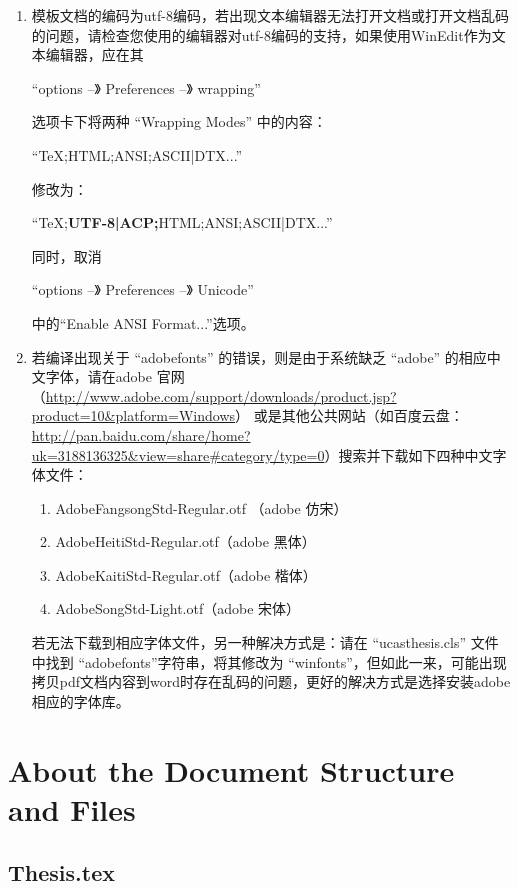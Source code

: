 \begin{enumerate}
  \item 模板文档的编码为utf-8编码，若出现文本编辑器无法打开文档或打开文档乱码的问题，请检查您使用的编辑器对utf-8编码的支持，如果使用WinEdit作为文本编辑器，应在其

  “options --》 Preferences --》 wrapping”

  选项卡下将两种 “Wrapping Modes” 中的内容：

  “TeX;HTML;ANSI;ASCII|DTX...”

  修改为：

  “TeX;\textbf{UTF-8|ACP;}HTML;ANSI;ASCII|DTX...”

  同时，取消

  “options --》 Preferences --》 Unicode”

  中的“Enable ANSI Format...”选项。

  \item 若编译出现关于 “adobefonts” 的错误，则是由于系统缺乏 “adobe” 的相应中文字体，请在adobe 官网（\url{http://www.adobe.com/support/downloads/product.jsp?product=10&platform=Windows}） 或是其他公共网站（如百度云盘：\url{http://pan.baidu.com/share/home?uk=3188136325&view=share#category/type=0}）搜索并下载如下四种中文字体文件：
      \begin{enumerate}
        \item AdobeFangsongStd-Regular.otf （adobe 仿宋）
        \item AdobeHeitiStd-Regular.otf（adobe 黑体）
        \item AdobeKaitiStd-Regular.otf（adobe 楷体）
        \item AdobeSongStd-Light.otf（adobe 宋体）
      \end{enumerate}

      若无法下载到相应字体文件，另一种解决方式是：请在 “ucasthesis.cls” 文件中找到 “adobefonts”字符串，将其修改为 “winfonts”，但如此一来，可能出现拷贝pdf文档内容到word时存在乱码的问题，更好的解决方式是选择安装adobe相应的字体库。
\end{enumerate}

\section{About the Document Structure and Files}

\subsection{Thesis.tex}

